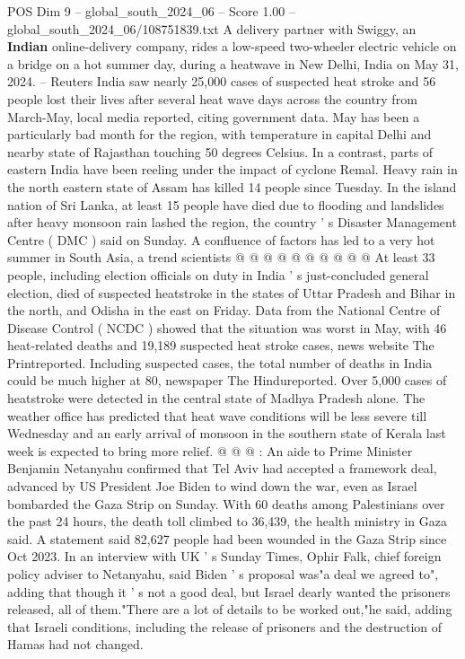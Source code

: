 \begin{textsample}{POS Dim 9 – global\_south\_2024\_06 – Score 1.00 – global\_south\_2024\_06/108751839.txt}  \label{ex:f9_pos_087}
A delivery partner with Swiggy, an \textbf{Indian} online-delivery company, rides a low-speed two-wheeler electric vehicle on a bridge on a hot summer day, during a heatwave in New Delhi, India on May 31, 2024. -- Reuters India saw nearly 25,000 cases of suspected heat stroke and 56 people lost their lives after several heat wave days across the country from March-May, local media reported, citing government data.
May has been a particularly bad month for the region, with temperature in capital Delhi and nearby state of Rajasthan touching 50 degrees Celsius.
In a contrast, parts of eastern India have been reeling under the impact of cyclone Remal.
Heavy rain in the north eastern state of Assam has killed 14 people since Tuesday.
In the island nation of Sri Lanka, at least 15 people have died due to flooding and landslides after heavy monsoon rain lashed the region, the country ' s Disaster Management Centre ( DMC ) said on Sunday.
A confluence of factors has led to a very hot summer in South Asia, a trend scientists @ @ @ @ @ @ @ @ @ @ At least 33 people, including election officials on duty in India ' s just-concluded general election, died of suspected heatstroke in the states of Uttar Pradesh and Bihar in the north, and Odisha in the east on Friday.
Data from the National Centre of Disease Control ( NCDC ) showed that the situation was worst in May, with 46 heat-related deaths and 19,189 suspected heat stroke cases, news website The Printreported.
Including suspected cases, the total number of deaths in India could be much higher at 80, newspaper The Hindureported.
Over 5,000 cases of heatstroke were detected in the central state of Madhya Pradesh alone.
The weather office has predicted that heat wave conditions will be less severe till Wednesday and an early arrival of monsoon in the southern state of Kerala last week is expected to bring more relief. @ @ @ : An aide to Prime Minister Benjamin Netanyahu confirmed that Tel Aviv had accepted a framework deal, advanced by US President Joe Biden to wind down the war, even as Israel bombarded the Gaza Strip on Sunday.
With 60 deaths among Palestinians over the past 24 hours, the death toll climbed to 36,439, the health ministry in Gaza said.
A statement said 82,627 people had been wounded in the Gaza Strip since Oct 2023.
In an interview with UK ' s Sunday Times, Ophir Falk, chief foreign policy adviser to Netanyahu, said Biden ' s proposal was"a deal we agreed to", adding that though it ' s not a good deal, but Israel dearly wanted the prisoners released, all of them."There are a lot of details to be worked out,"he said, adding that Israeli conditions, including the release of prisoners and the destruction of Hamas had not changed.

\end{textsample}
